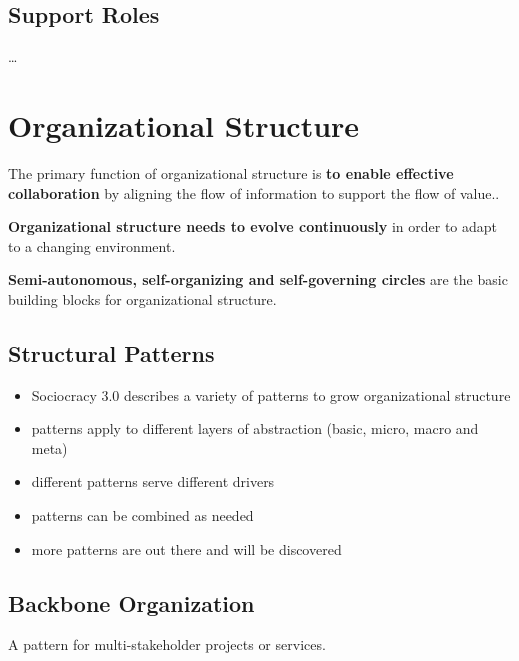 \section{Support Roles}
\label{supportroles}

{\ldots}

\chapter{Organizational Structure}
\label{organizationalstructure}

The primary function of organizational structure is \textbf{to enable effective collaboration} by aligning the flow of information to support the flow of value..

\textbf{Organizational structure needs to evolve continuously} in order to adapt to a changing environment.

\textbf{Semi-autonomous, self-organizing and self-governing circles} are the basic building blocks for organizational structure.

\section{Structural Patterns}
\label{structuralpatterns}

\begin{itemize}
\item Sociocracy 3.0 describes a variety of patterns to grow organizational structure

\item patterns apply to different layers of abstraction (basic, micro, macro and meta)

\item different patterns serve different drivers

\item patterns can be combined as needed

\item more patterns are out there and will be discovered

\end{itemize}

\section{Backbone Organization}
\label{backboneorganization}

A pattern for multi-stakeholder projects or services.

